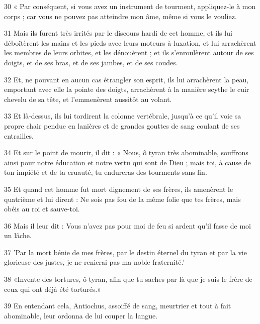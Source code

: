 \par 30 « Par conséquent, si vous avez un instrument de tourment, appliquez-le à mon corps ; car vous ne pouvez pas atteindre mon âme, même si vous le vouliez.

\par 31 Mais ils furent très irrités par le discours hardi de cet homme, et ils lui déboîtèrent les mains et les pieds avec leurs moteurs à luxation, et lui arrachèrent les membres de leurs orbites, et les dénouèrent ; et ils s'enroulèrent autour de ses doigts, et de ses bras, et de ses jambes, et de ses coudes.

\par 32 Et, ne pouvant en aucun cas étrangler son esprit, ils lui arrachèrent la peau, emportant avec elle la pointe des doigts, arrachèrent à la manière scythe le cuir chevelu de sa tête, et l'emmenèrent aussitôt au volant.

\par 33 Et là-dessus, ils lui tordirent la colonne vertébrale, jusqu'à ce qu'il voie sa propre chair pendue en lanières et de grandes gouttes de sang coulant de ses entrailles.

\par 34 Et sur le point de mourir, il dit : « Nous, ô tyran très abominable, souffrons ainsi pour notre éducation et notre vertu qui sont de Dieu ; mais toi, à cause de ton impiété et de ta cruauté, tu endureras des tourments sans fin.

\par 35 Et quand cet homme fut mort dignement de ses frères, ils amenèrent le quatrième et lui dirent : Ne sois pas fou de la même folie que tes frères, mais obéis au roi et sauve-toi.

\par 36 Mais il leur dit : Vous n'avez pas pour moi de feu si ardent qu'il fasse de moi un lâche.

\par 37 'Par la mort bénie de mes frères, par le destin éternel du tyran et par la vie glorieuse des justes, je ne renierai pas ma noble fraternité.'

\par 38 «Invente des tortures, ô tyran, afin que tu saches par là que je suis le frère de ceux qui ont déjà été torturés.»

\par 39 En entendant cela, Antiochus, assoiffé de sang, meurtrier et tout à fait abominable, leur ordonna de lui couper la langue.

